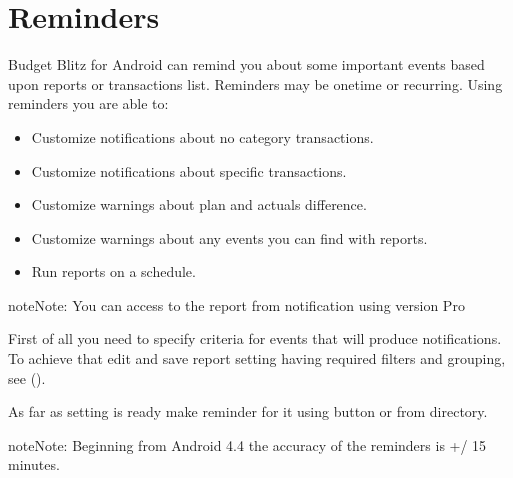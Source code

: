 \documentclass[a4paper,10pt,english]{sphinxmanual}
\begin{document}
\noindent{}

\sphinxstepscope


\chapter{Reminders}
\label{\detokenize{reminders:reminders}}\label{\detokenize{reminders:chapter-reminders}}\label{\detokenize{reminders::doc}}
\sphinxAtStartPar
Budget Blitz for Android can remind you about some important events based upon reports or transactions list. Reminders
may be one\sphinxhyphen{}time or recurring. Using reminders you are able to:
\begin{itemize}
\item {} 
\sphinxAtStartPar
Customize notifications about no category transactions.

\item {} 
\sphinxAtStartPar
Customize notifications about specific transactions.

\item {} 
\sphinxAtStartPar
Customize warnings about plan and actuals difference.

\item {} 
\sphinxAtStartPar
Customize warnings about any events you can find with reports.

\item {} 
\sphinxAtStartPar
Run reports on a schedule.

\end{itemize}

\begin{sphinxadmonition}{note}{Note:}
\sphinxAtStartPar
You can access to the report from notification using version Pro
\end{sphinxadmonition}

\sphinxAtStartPar
First of all you need to specify criteria for events that will produce notifications.
To achieve that edit and save report setting having required filters and grouping, see
{\hyperref[\detokenize{shortcuts:chapter-shortcuts}]{}} ().

\sphinxAtStartPar
As far as setting is ready make reminder for it using  button or from 
directory.

\begin{sphinxadmonition}{note}{Note:}
\sphinxAtStartPar
Beginning from Android 4.4 the accuracy of the reminders is +/\sphinxhyphen{} 15 minutes.
\end{sphinxadmonition}
\end{document}
